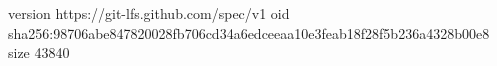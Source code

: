version https://git-lfs.github.com/spec/v1
oid sha256:98706abe847820028fb706cd34a6edceeaa10e3feab18f28f5b236a4328b00e8
size 43840
